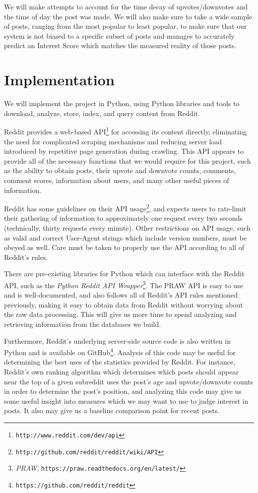 \documentclass{acm_proc_article-sp}
\begin{document}
We will make attempts to account for the time decay of upvotes/downvotes and the time of day the post was made. We will
also make sure to take a wide sample of posts, ranging from the most popular to least popular, to make sure that our system
is not biased to a specific subset of posts and manages to accurately predict an Interest Score which matches the
measured reality of those posts.


\section{Implementation}
We will implement the project in Python, using Python libraries and tools to download, analyze,
store, index, and query content from Reddit.

Reddit provides a web-based API\footnote{\texttt{http://www.reddit.com/dev/api}} for accessing its
content directly, eliminating the need for complicated scraping mechanisms and reducing server
load introduced by repetitive page generation during crawling.  This API appears to provide all
of the necessary functions that we would require for this project, such as the ability to
obtain posts, their upvote and downvote counts, comments, comment scores, information about
users, and many other useful pieces of information.

Reddit has some guidelines on their API usage\footnote{\texttt{http://github.com/reddit/reddit/wiki/API}},
and expects users to rate-limit their gathering of information to approximately one request every two seconds
(technically, thirty requests every minute).  Other restrictions on API usage, such as valid
and correct User-Agent strings which include version numbers, must be obeyed as well.
Care must be taken to properly use the API according to all of Reddit's rules.

There are pre-existing libraries for Python which can interface with the Reddit API, such as
the \textit{Python Reddit API Wrapper}\footnote{\textit{PRAW}, \texttt{https://praw.readthedocs.org/en/latest/}}.
The PRAW API is easy to use and is well-documented, and also follows all of Reddit's API rules
mentioned previously, making it easy to obtain data from Reddit without worrying about the raw
data processing.  This will give us more time to spend analyzing and retrieving information
from the databases we build.

Furthermore, Reddit's underlying server-side source code is also written
in Python and is available on GitHub\footnote{\texttt{https://github.com/reddit/reddit}}.  Analysis of this
code may be useful for determining the best uses of the statistics provided by Reddit.  For instance,
Reddit's own ranking algorithm which determines which posts should appear near the top of a given
subreddit uses the post's age and upvote/downvote counts in order to determine the post's position,
and analyzing this code may give us some useful insight into measures which we may want to use to
judge interest in posts.  It also may give us a baseline comparison point for recent posts.
\end{document}
